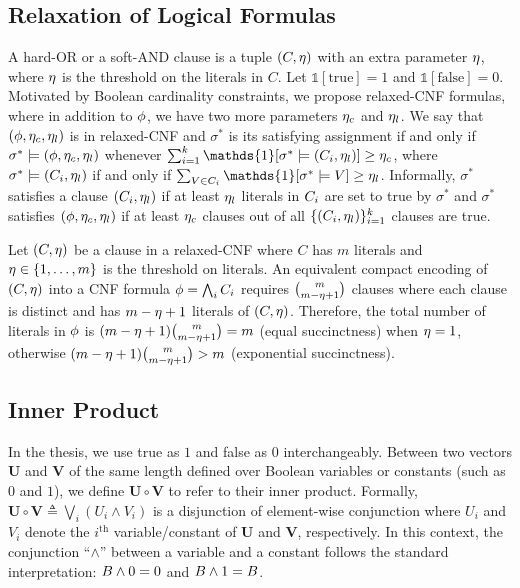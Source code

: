 \subsection{Relaxation of Logical Formulas}

A hard-OR or a soft-AND clause is a tuple $ (C,\eta) $ with an extra parameter $ \eta $, where $ \eta $ is the threshold on the literals in $ C $. Let $ \mathds{1}[\text{true}]=1 $ and $ \mathds{1}[\text{false}]=0 $. Motivated by Boolean cardinality constraints, we propose relaxed-CNF formulas, where in addition to $\phi$, we have two more parameters $\eta_c$ and $\eta_l$. We say that $(\phi,\eta_c, \eta_l)$ is in relaxed-CNF and $ \sigma^* $ is its satisfying assignment if and only if $\sigma^* \models (\phi,\eta_c, \eta_l)$ whenever $\sum_{i=1}^k \mathds{1}[\sigma^* \models (\propclause_i,\card_l)] \ge \card_c$, where $\sigma^* \models (C_i, \eta_l)$ if and only if $\sum_{V \in \propclause_i} \mathds{1}[\sigma^* \models V] \geq \card_l$. Informally,  $\sigma^*$ satisfies a clause $(C_i, \eta_l)$ if  at least $\eta_l$ literals in $C_i$ are set to true by $\sigma^*$ and $\sigma^*$ satisfies $(\phi,\eta_c, \eta_l)$ if at least $\eta_c$  clauses out of all $\{(C_i,\eta_l)\}_{i=1}^k$ clauses are true. 


\begin{theorem}
	\label{interpretability_crr_thm:succinctness}	
	Let $ (C,\eta) $ be a clause in a relaxed-CNF where  $ C $ has $ m  $ literals and $ \eta \in \{1,\dots,m\} $ is the threshold on literals.  An equivalent compact encoding of $ (C,\eta) $  into a CNF formula $ \phi= \bigwedge_i C_i $ requires $ {m \choose{m-\eta+1}} $  clauses where each clause is distinct and has $ m-\eta+1 $ literals of $ (C,\eta) $. Therefore,  the total number of literals in $ \phi $ is $ (m-\eta+1){m\choose{m-\eta+1}} = m $ (equal succinctness) when $ \eta=1 $, otherwise $ (m-\eta+1){m\choose{m-\eta+1}} > m $ (exponential succinctness).
\end{theorem}


\subsection{Inner Product}
In the thesis, we use true as $ 1 $ and false as $ 0 $ interchangeably. Between two vectors  $\mathbf{U}$ and $\mathbf{V}$ of the same length defined over Boolean variables or constants (such as  $ 0 $ and $ 1 $), we define $\mathbf{U} \circ \mathbf{V} $  to refer to  their inner product. Formally, $\mathbf{U} \circ \mathbf{V} \triangleq \bigvee_{i} (U_{i} \wedge V_{i})$ is a disjunction of element-wise conjunction where $U_{i}$ and $V_{i}$ denote the $ i^\text{th} $ variable/constant of $\mathbf{U}$ and $\mathbf{V}$, respectively. In this context, the conjunction ``$\wedge$'' between a variable and a constant follows the standard interpretation: $B \wedge 0 = 0$ and $B \wedge 1 = B$.  

